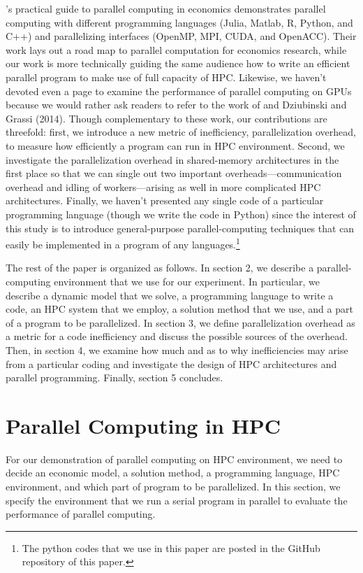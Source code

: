 \documentclass[12pt]{article}
\begin{document}
\cite{Fernandez-Villaverde-Valencia-18}'s practical guide to parallel computing in economics demonstrates parallel computing with different programming languages (Julia, Matlab, R, Python, and C++) and parallelizing interfaces (OpenMP, MPI, CUDA, and OpenACC). Their work lays out a road map to parallel computation for economics research, while our work is more technically guiding the same audience how to write an efficient parallel program to make use of full capacity of HPC. Likewise, we haven't devoted even a page to examine the performance of parallel computing on GPUs because we would rather ask readers to refer to the work of \cite{Aldrich-Fernandez-Villaverde-Gallant-Rubio-Ramirez-11} and Dziubinski and Grassi (2014). Though complementary to these work, our contributions are threefold: first, we introduce a new metric of inefficiency, parallelization overhead, to measure how efficiently a program can run in HPC environment. Second, we investigate the parallelization overhead in shared-memory architectures in the first place so that we can single out two important overheads---communication overhead and idling of workers---arising as well in more complicated HPC architectures. Finally, we haven't presented any single code of a particular programming language (though we write the code in Python) since the interest of this study is to introduce general-purpose parallel-computing techniques that can easily be implemented in a program of any languages.\footnote{\sf The python codes that we use in this paper are posted in the GitHub repository of this paper.}

\cite{Maliar-15}
\cite{Dziubinski-Grassi-14}
\cite{Creel-Goffe-08}
\cite{Pinho-de-Carvalho-Junior-14}

The rest of the paper is organized as follows. In section 2, we describe a parallel-computing environment that we use for our experiment. In particular, we describe a dynamic model that we solve, a programming language to write a code, an HPC system that we employ, a solution method that we use, and a part of a program to be parallelized. In section 3, we define parallelization overhead as a metric for a code inefficiency and discuss the possible sources of the overhead. Then, in section 4, we examine how much and as to why inefficiencies may arise from a particular coding and investigate the design of HPC architectures and parallel programming. Finally, section 5 concludes.



\section{Parallel Computing in HPC}
For our demonstration of parallel computing on HPC environment, we need to decide an economic model, a solution method, a programming language, HPC environment, and which part of program to be parallelized. In this section, we specify the environment that we run a serial program in parallel to evaluate the performance of parallel computing.
\end{document}
